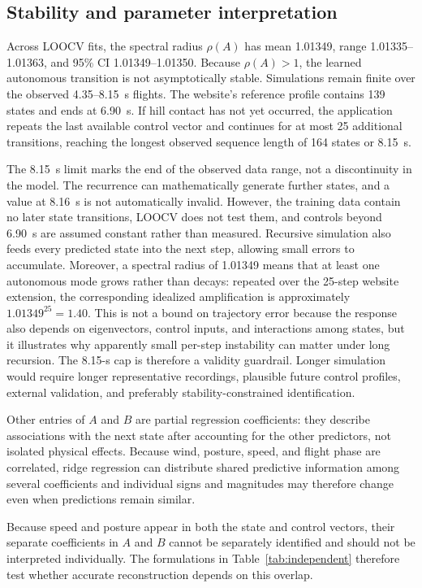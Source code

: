 \documentclass[11pt,twoside,a4paper]{article}
\begin{document}
\subsection{Stability and parameter interpretation}

Across LOOCV fits, the spectral radius $\rho(A)$ has mean 1.01349, range 1.01335--1.01363, and 95\% CI 1.01349--1.01350. Because $\rho(A)>1$, the learned autonomous transition is not asymptotically stable. Simulations remain finite over the observed 4.35--8.15~s flights. The website's reference profile contains 139 states and ends at 6.90~s. If hill contact has not yet occurred, the application repeats the last available control vector and continues for at most 25 additional transitions, reaching the longest observed sequence length of 164 states or 8.15~s.

The 8.15~s limit marks the end of the observed data range, not a discontinuity in the model. The recurrence can mathematically generate further states, and a value at 8.16~s is not automatically invalid. However, the training data contain no later state transitions, LOOCV does not test them, and controls beyond 6.90~s are assumed constant rather than measured. Recursive simulation also feeds every predicted state into the next step, allowing small errors to accumulate. Moreover, a spectral radius of 1.01349 means that at least one autonomous mode grows rather than decays: repeated over the 25-step website extension, the corresponding idealized amplification is approximately $1.01349^{25}=1.40$. This is not a bound on trajectory error because the response also depends on eigenvectors, control inputs, and interactions among states, but it illustrates why apparently small per-step instability can matter under long recursion. The 8.15-s cap is therefore a validity guardrail. Longer simulation would require longer representative recordings, plausible future control profiles, external validation, and preferably stability-constrained identification.

Other entries of $A$ and $B$ are partial regression coefficients: they describe associations with the next state after accounting for the other predictors, not isolated physical effects. Because wind, posture, speed, and flight phase are correlated, ridge regression can distribute shared predictive information among several coefficients and individual signs and magnitudes may therefore change even when predictions remain similar.

Because speed and posture appear in both the state and control vectors, their separate coefficients in $A$ and $B$ cannot be separately identified and should not be interpreted individually. The formulations in Table~\ref{tab:independent} therefore test whether accurate reconstruction depends on this overlap.
\end{document}
